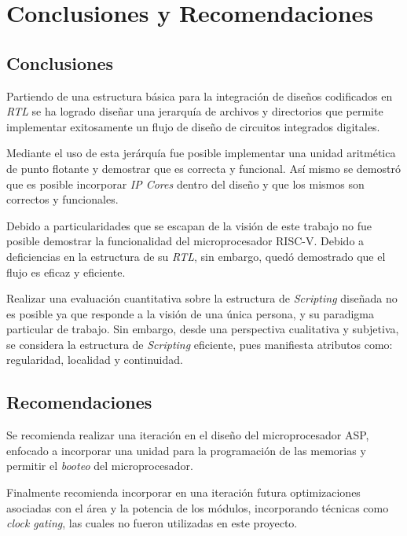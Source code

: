 \chapter{Conclusiones y Recomendaciones}

\section{Conclusiones}
Partiendo de una estructura básica para la integración de diseños codificados en \textit{RTL} se ha logrado diseñar una jerarquía de archivos y directorios que permite implementar exitosamente un flujo de diseño de circuitos integrados digitales.

Mediante el uso de esta jerárquía fue posible implementar una unidad aritmética de punto flotante y demostrar que es correcta y funcional. Así mismo se demostró que es posible incorporar \textit{IP Cores} dentro del diseño y que los mismos son correctos y funcionales.

Debido a particularidades que se escapan de la visión de este trabajo no fue posible demostrar la funcionalidad del microprocesador RISC-V. Debido a deficiencias en la estructura de su \textit{RTL}, sin embargo, quedó demostrado que el flujo es eficaz y eficiente.

Realizar una evaluación cuantitativa sobre la estructura de \textit{Scripting} diseñada no es posible ya que responde a la visión de una única persona, y su paradigma particular de trabajo. Sin embargo, desde una perspectiva cualitativa y subjetiva, se considera la estructura de \textit{Scripting} eficiente, pues manifiesta atributos como: regularidad, localidad y continuidad.

\section{Recomendaciones}

Se recomienda realizar una iteración en el diseño del microprocesador ASP, enfocado a incorporar una unidad para la programación de las memorias y permitir el \textit{booteo} del microprocesador.

Finalmente recomienda incorporar en una iteración futura optimizaciones asociadas con el área y la potencia de los módulos, incorporando técnicas como \textit{clock gating}, las cuales no fueron utilizadas en este proyecto.